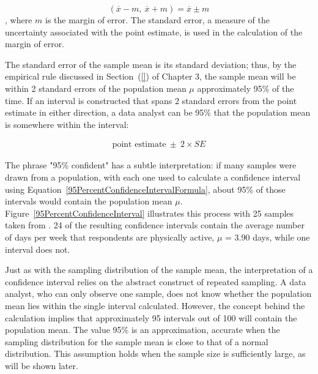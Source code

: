 \begin{spacing}{1.5}
\[(\overline{x} -m, \ \overline{x} + m) = \overline{x} \pm m \],
where $m$ is the margin of error. The standard error, a measure of the uncertainty associated with the point estimate, is used in the calculation of the margin of error.


The standard error of the sample mean is its standard deviation; thus, by the empirical rule discussed in Section~(\ref{}) of Chapter 3, the sample mean will be within 2 standard errors of the population mean $\mu$ approximately 95\% of the time. If an interval is constructed that spans 2 standard errors from the point estimate in either direction, a data analyst can be 95\%  that the population mean is somewhere within the interval:

\begin{align}
\text{point estimate}\ \pm\ 2\times SE
\label{95PercentConfidenceIntervalFormula}
\end{align}

The phrase "95\% confident" has a subtle interpretation: if many samples were drawn from a population, with each one used to calculate a confidence interval using Equation~\ref{95PercentConfidenceIntervalFormula}, about 95\% of those intervals would contain the population mean $\mu$. Figure~\ref{95PercentConfidenceInterval} illustrates this process with 25 samples taken from . 24 of the resulting confidence intervals contain the average number of days per week that respondents are physically active, $\mu$ = 3.90 days, while one interval does not. 

Just as with the sampling distribution of the sample mean, the interpretation of a confidence interval relies on the abstract construct of repeated sampling. A data analyst, who can only observe one sample, does not know whether the population mean lies within the single interval calculated. However, the concept behind the calculation implies that approximately 95 intervals out of 100 will contain the population mean. The value 95\% is an approximation, accurate when the sampling distribution for the sample mean is close to that of a normal distribution. This assumption holds when the sample size is sufficiently large, as will be shown later.


\end{spacing}
